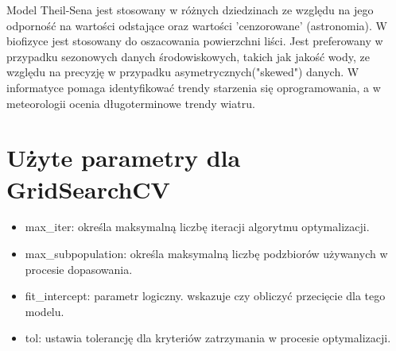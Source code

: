 Model Theil-Sena jest stosowany w różnych dziedzinach ze względu na jego odporność na wartości odstające oraz wartości 'cenzorowane' (astronomia). W biofizyce jest stosowany do oszacowania powierzchni liści. Jest preferowany w przypadku sezonowych danych środowiskowych, takich jak jakość wody, ze względu na precyzję w przypadku asymetrycznych("skewed") danych. W informatyce pomaga identyfikować trendy starzenia się oprogramowania, a w meteorologii ocenia długoterminowe trendy wiatru.



{}
\section*{Użyte parametry dla GridSearchCV \cite{url_TheilSenRegressor, url_grid_search}}
\vspace{-1.0em}
\label{sec:ml_challenges}

\begin{itemize}
\setlength\itemsep{-0.5em}
\item max\_iter: określa maksymalną liczbę iteracji algorytmu optymalizacji.
\item max\_subpopulation: określa maksymalną liczbę podzbiorów używanych w procesie dopasowania.
\item fit\_intercept: parametr logiczny. wskazuje czy obliczyć przecięcie dla tego modelu.
\item tol: ustawia tolerancję dla kryteriów zatrzymania w procesie optymalizacji.
\end{itemize}

\noindent\makebox[\linewidth]{\rule{\paperwidth}{0.4pt}}
